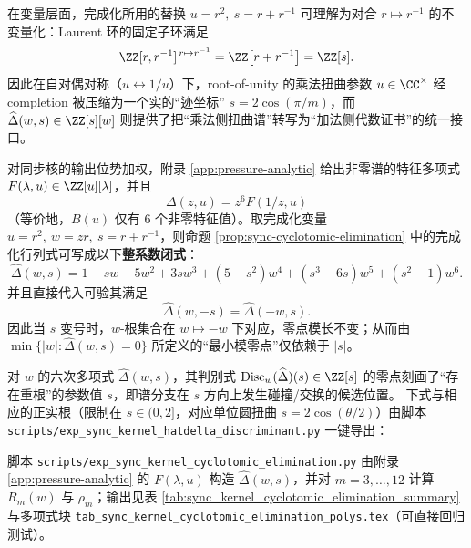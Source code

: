 \begin{remark}\label{rem:completion-invariant-ring}
在变量层面，完成化所用的替换
\(
u=r^2,\ s=r+r^{-1}
\)
可理解为对合 \(r\mapsto r^{-1}\) 的不变量化：Laurent 环的固定子环满足
\[
\ZZ[r,r^{-1}]^{\,r\mapsto r^{-1}}
=\ZZ\!\left[r+r^{-1}\right]
=\ZZ[s].
\]
因此在自对偶对称（\(u\leftrightarrow 1/u\)）下，root-of-unity 的乘法扭曲参数 \(u\in\CC^\times\) 经 completion 被压缩为一个实的“迹坐标” \(s=2\cos(\pi/m)\)，而 \(\widehat\Delta(w,s)\in\ZZ[s][w]\) 则提供了把“乘法侧扭曲谱”转写为“加法侧代数证书”的统一接口。
\end{remark}

\begin{remark}\label{rem:sync-hatdelta-explicit}
对同步核的输出位势加权，附录 \ref{app:pressure-analytic} 给出非零谱的特征多项式 $F(\lambda,u)\in\ZZ[u][\lambda]$，并且
\[
\Delta(z,u)=z^6F(1/z,u)
\]
（等价地，$B(u)$ 仅有 $6$ 个非零特征值）。取完成化变量 $u=r^2,\ w=zr,\ s=r+r^{-1}$，则命题 \ref{prop:sync-cyclotomic-elimination} 中的完成化行列式可写成以下\textbf{整系数闭式}：
\[
\boxed{\;
\widehat\Delta(w,s)=
1-sw-5w^2+3sw^3+(5-s^2)w^4+(s^3-6s)w^5+(s^2-1)w^6.
\;}
\]
并且直接代入可验其满足
\[
\widehat\Delta(w,-s)=\widehat\Delta(-w,s).
\]
因此当 $s$ 变号时，$w$-根集合在 $w\mapsto -w$ 下对应，零点模长不变；从而由 $\min\{|w|:\widehat\Delta(w,s)=0\}$ 所定义的“最小模零点”仅依赖于 $|s|$。
\end{remark}

\begin{remark}\label{rem:sync-hatdelta-discriminant-branch}
对 \(w\) 的六次多项式 \(\widehat\Delta(w,s)\)，其判别式 \(\mathrm{Disc}_w(\widehat\Delta)(s)\in\ZZ[s]\) 的零点刻画了“存在重根”的参数值 \(s\)，即谱分支在 \(s\) 方向上发生碰撞/交换的候选位置。
下式与相应的正实根（限制在 \(s\in(0,2]\)，对应单位圆扭曲 \(s=2\cos(\theta/2)\)）由脚本 \texttt{scripts/exp\_sync\_kernel\_hatdelta\_discriminant.py} 一键导出：


\end{remark}

\begin{remark}[可复现输出：\texorpdfstring{$m=3,\dots,12$}{m=3..12} 的 \texorpdfstring{$R_m$}{Rm} 与 \texorpdfstring{$\rho_m$}{rhom}]\label{rem:sync-cyclotomic-elimination-table}
脚本 \texttt{scripts/exp\_sync\_kernel\_cyclotomic\_elimination.py} 由附录 \ref{app:pressure-analytic} 的 $F(\lambda,u)$ 构造 $\widehat{\Delta}(w,s)$，并对 $m=3,\dots,12$ 计算 $R_m(w)$ 与 $\rho_m$；输出见表 \ref{tab:sync_kernel_cyclotomic_elimination_summary} 与多项式块 \texttt{tab\_sync\_kernel\_cyclotomic\_elimination\_polys.tex}（可直接回归测试）。
\end{remark}

